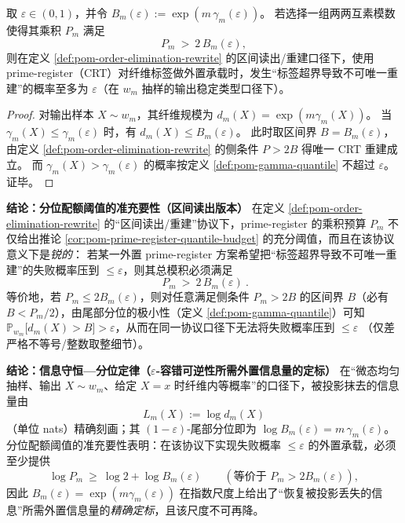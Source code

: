\begin{corollary}\label{cor:pom-prime-register-quantile-budget}
取 \(\varepsilon\in(0,1)\)，并令 \(B_m(\varepsilon):=\exp(m\,\gamma_m(\varepsilon))\)。
若选择一组两两互素模数使得其乘积 \(P_m\) 满足
$$
P_m\ >\ 2\,B_m(\varepsilon),
$$
则在定义 \ref{def:pom-order-elimination-rewrite} 的区间读出/重建口径下，使用 prime-register（CRT）对纤维标签做外置承载时，发生“标签超界导致不可唯一重建”的概率至多为 \(\varepsilon\)（在 \(w_m\) 抽样的输出稳定类型口径下）。
\end{corollary}

\begin{proof}
对输出样本 \(X\sim w_m\)，其纤维规模为 \(d_m(X)=\exp(m\gamma_m(X))\)。
当 \(\gamma_m(X)\le\gamma_m(\varepsilon)\) 时，有 \(d_m(X)\le B_m(\varepsilon)\)。
此时取区间界 \(B=B_m(\varepsilon)\)，由定义 \ref{def:pom-order-elimination-rewrite} 的侧条件 \(P>2B\) 得唯一 CRT 重建成立。
而 \(\gamma_m(X)>\gamma_m(\varepsilon)\) 的概率按定义 \ref{def:pom-gamma-quantile} 不超过 \(\varepsilon\)。证毕。
\end{proof}

\medskip\noindent\textbf{结论：分位配额阈值的准充要性（区间读出版本）}
在定义 \ref{def:pom-order-elimination-rewrite} 的“区间读出/重建”协议下，prime-register 的乘积预算 \(P_m\) 不仅给出推论 \ref{cor:pom-prime-register-quantile-budget} 的充分阈值，而且在该协议意义下是\emph{锐的}：
若某一外置 prime-register 方案希望把“标签超界导致不可唯一重建”的失败概率压到 \(\le \varepsilon\)，则其总模积必须满足
\[
\boxed{\ P_m\ >\ 2\,B_m(\varepsilon)\ }.
\]
等价地，若 \(P_m\le 2B_m(\varepsilon)\)，则对任意满足侧条件 \(P_m>2B\) 的区间界 \(B\)（必有 \(B<P_m/2\)），由尾部分位的极小性（定义 \ref{def:pom-gamma-quantile}）可知
\(\mathbb{P}_{w_m}\!\big[d_m(X)>B\big]>\varepsilon\)，从而在同一协议口径下无法将失败概率压到 \(\le\varepsilon\)
（仅差严格不等号/整数取整细节）。

\medskip\noindent\textbf{结论：信息守恒—分位定律（\(\varepsilon\)-容错可逆性所需外置信息量的定标）}
在“微态均匀抽样、输出 \(X\sim w_m\)、给定 \(X=x\) 时纤维内等概率”的口径下，被投影抹去的信息量由
\[
L_m(X):=\log d_m(X)
\]
（单位 nats）精确刻画；其 \((1-\varepsilon)\)-尾部分位即为
\(\log B_m(\varepsilon)=m\,\gamma_m(\varepsilon)\)。
分位配额阈值的准充要性表明：在该协议下实现失败概率 \(\le\varepsilon\) 的外置承载，必须至少提供
\[
\log P_m\ \ge\ \log 2+\log B_m(\varepsilon)
\qquad(\text{等价于 }P_m>2B_m(\varepsilon)),
\]
因此 \(B_m(\varepsilon)=\exp(m\gamma_m(\varepsilon))\) 在指数尺度上给出了“恢复被投影丢失的信息”所需外置信息量的\emph{精确定标}，且该尺度不可再降。

